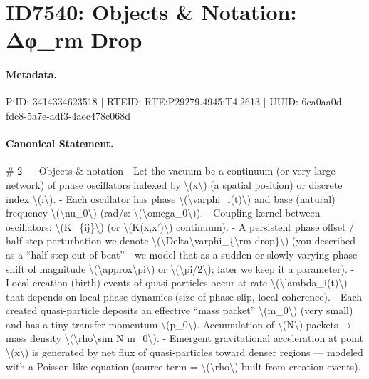 \section*{ID7540: Objects \& Notation: Δφ\_rm Drop}
\paragraph{Metadata.}
PiID: 3414334623518 | RTEID: RTE:P29279.4945:T4.2613 | UUID: 6ca0aa0d-fdc8-5a7e-adf3-4aec478c068d

\paragraph{Canonical Statement.}
\# 2 — Objects \& notation - Let the vacuum be a continuum (or very large network) of phase oscillators indexed by \textbackslash{}(x\textbackslash{}) (a spatial position) or discrete index \textbackslash{}(i\textbackslash{}). - Each oscillator has phase \textbackslash{}(\textbackslash{}varphi\_i(t)\textbackslash{}) and base (natural) frequency \textbackslash{}(\textbackslash{}nu\_0\textbackslash{}) (rad/s: \textbackslash{}(\textbackslash{}omega\_0\textbackslash{})). - Coupling kernel between oscillators: \textbackslash{}(K\_\{ij\}\textbackslash{}) (or \textbackslash{}(K(x,x')\textbackslash{}) continuum). - A persistent phase offset / half-step perturbation we denote \textbackslash{}(\textbackslash{}Delta\textbackslash{}varphi\_\{\textbackslash{}rm drop\}\textbackslash{}) (you described as a “half-step out of beat”—we model that as a sudden or slowly varying phase shift of magnitude \textbackslash{}(\textbackslash{}approx\textbackslash{}pi\textbackslash{}) or \textbackslash{}(\textbackslash{}pi/2\textbackslash{}); later we keep it a parameter). - Local creation (birth) events of quasi-particles occur at rate \textbackslash{}(\textbackslash{}lambda\_i(t)\textbackslash{}) that depends on local phase dynamics (size of phase slip, local coherence). - Each created quasi-particle deposits an effective “mass packet” \textbackslash{}(m\_0\textbackslash{}) (very small) and has a tiny transfer momentum \textbackslash{}(p\_0\textbackslash{}). Accumulation of \textbackslash{}(N\textbackslash{}) packets → mass density \textbackslash{}(\textbackslash{}rho\textbackslash{}sim N m\_0\textbackslash{}). - Emergent gravitational acceleration at point \textbackslash{}(x\textbackslash{}) is generated by net flux of quasi-particles toward denser regions — modeled with a Poisson-like equation (source term = \textbackslash{}(\textbackslash{}rho\textbackslash{}) built from creation events).

